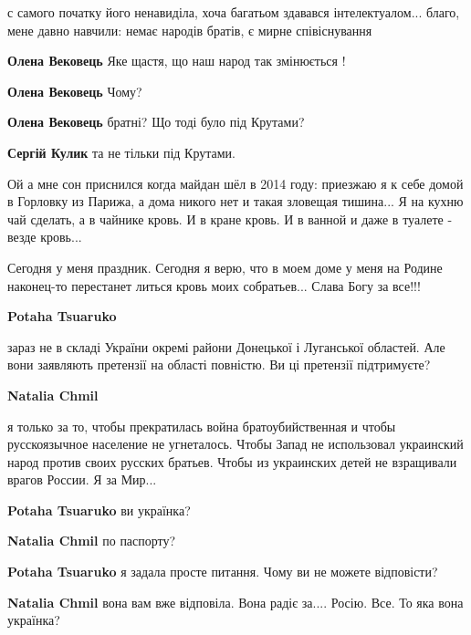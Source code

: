 \begin{itemize}
\begin{itemize}
\begin{itemize}
с самого початку його ненавиділа, хоча багатьом здавався інтелектуалом...
благо, мене давно навчили: немає народів братів, є мирне співіснування

\textbf{Олена Вековець} Яке щастя, що наш народ так змінюється !

\textbf{Олена Вековець} Чому?

\textbf{Олена Вековець} братні? Що тоді було під Крутами?

\textbf{Сергій Кулик} та не тільки під Крутами.
\end{itemize} %

\end{itemize} %


Ой а мне сон приснился когда майдан шёл в 2014 году: приезжаю я к себе домой в
Горловку из Парижа, а дома никого нет и такая зловещая тишина... Я на кухню чай
сделать, а в чайнике кровь. И в кране кровь. И в ванной и даже в туалете -
везде кровь...

Сегодня у меня праздник. Сегодня я верю, что в моем доме у меня на Родине
наконец-то перестанет литься кровь моих собратьев... Слава Богу за все!!!

\begin{itemize} %
\textbf{Potaha Tsuaruko} 

зараз не в складі України окремі райони Донецької і Луганської областей. Але
вони заявляють претензії на області повністю. Ви ці претензії підтримуєте?

\begin{itemize} %
\textbf{Natalia Chmil} 

я только за то, чтобы прекратилась война братоубийственная и чтобы
русскоязычное население не угнеталось. Чтобы Запад не использовал украинский
народ против своих русских братьев. Чтобы из украинских детей не взращивали
врагов России. Я за Мир...

\textbf{Potaha Tsuaruko} ви українка?

\textbf{Natalia Chmil} по паспорту?

\textbf{Potaha Tsuaruko} я задала просте питання. Чому ви не можете відповісти?

\textbf{Natalia Chmil} вона вам вже відповіла. Вона радіє за.... Росію. Все. То яка вона українка?


\end{itemize}
\end{itemize}
\end{itemize}
